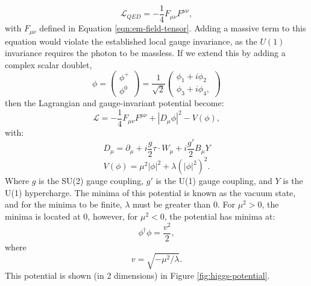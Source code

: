 \begin{equation}
    \mathcal{L}_{QED} = - \frac{1}{4} F_{\mu \nu}F^{\mu \nu},
\end{equation}
with $F_{\mu \nu}$ defined in Equation \ref{eqn:em-field-tensor}. Adding a massive term to this equation would violate the established local gauge invariance, as the $U(1)$ invariance requires the photon to be massless. If we extend this by adding a complex scalar doublet,
\begin{equation}
\phi = \begin{pmatrix} \phi^+ \\ \phi^0 \end{pmatrix}
    = \frac{1}{\sqrt{2}}\begin{pmatrix}
        \phi_1 + i\phi_2 \\ \phi_3 + i\phi_4,
    \end{pmatrix}
\end{equation}
%
then the Lagrangian and gauge-invariant potential become:
\begin{equation}
    \mathcal{L} = - \frac{1}{4} F_{\mu \nu}F^{\mu \nu} + |D_{\mu}\phi|^2 - V(\phi),
\end{equation}
with:
\begin{equation}
    D_{\mu} = \partial_{\mu} + i \frac{g}{2}\tau \cdot W_{\mu} + i \frac{g'}{2}B_{\mu}Y
\end{equation}
\begin{equation}
    V(\phi) = \mu^2 |\phi|^2 + \lambda (|\phi|^2)^2.
\end{equation}
Where $g$ is the SU(2) gauge coupling, $g'$ is the U(1) gauge coupling, and $Y$ is the U(1) hypercharge. The minima of this potential is known as the vacuum state, and for the minima to be finite, $\lambda$ must be greater than 0. For $\mu^2 >0$, the minima is located at 0, however, for $\mu^2<0$, the potential has minima at:
\begin{equation}
    \phi^\dagger \phi = \frac{v^2}{2},
\end{equation}
where 
\begin{equation}
    v = \sqrt{-\mu^2 / \lambda}.
\end{equation}
This potential is shown (in 2 dimensions) in Figure \ref{fig:higgs-potential}. 

